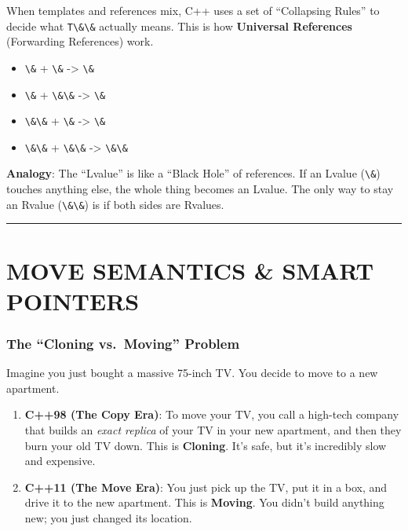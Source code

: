 When templates and references mix, C++ uses a set of ``Collapsing
Rules'' to decide what \passthrough{\lstinline!T\&\&!} actually means.
This is how \textbf{Universal References} (Forwarding References) work.

\begin{itemize}
\tightlist
\item
  \passthrough{\lstinline!\&!} + \passthrough{\lstinline!\&!}
  -\textgreater{} \passthrough{\lstinline!\&!}
\item
  \passthrough{\lstinline!\&!} + \passthrough{\lstinline!\&\&!}
  -\textgreater{} \passthrough{\lstinline!\&!}
\item
  \passthrough{\lstinline!\&\&!} + \passthrough{\lstinline!\&!}
  -\textgreater{} \passthrough{\lstinline!\&!}
\item
  \passthrough{\lstinline!\&\&!} + \passthrough{\lstinline!\&\&!}
  -\textgreater{} \passthrough{\lstinline!\&\&!}
\end{itemize}

\textbf{Analogy}: The ``Lvalue'' is like a ``Black Hole'' of references.
If an Lvalue (\passthrough{\lstinline!\&!}) touches anything else, the
whole thing becomes an Lvalue. The only way to stay an Rvalue
(\passthrough{\lstinline!\&\&!}) is if both sides are Rvalues.

\begin{center}\rule{0.5\linewidth}{0.5pt}\end{center}

\hypertarget{move-semantics-smart-pointers}{%
\section{MOVE SEMANTICS \& SMART
POINTERS}\label{move-semantics-smart-pointers}}

\hypertarget{the-cloning-vs.-moving-problem}{%
\subsubsection{The ``Cloning vs.~Moving''
Problem}\label{the-cloning-vs.-moving-problem}}

Imagine you just bought a massive 75-inch TV. You decide to move to a
new apartment.

\begin{enumerate}
\def\labelenumi{\arabic{enumi}.}
\tightlist
\item
  \textbf{C++98 (The Copy Era)}: To move your TV, you call a high-tech
  company that builds an \emph{exact replica} of your TV in your new
  apartment, and then they burn your old TV down. This is
  \textbf{Cloning}. It's safe, but it's incredibly slow and expensive.
\item
  \textbf{C++11 (The Move Era)}: You just pick up the TV, put it in a
  box, and drive it to the new apartment. This is \textbf{Moving}. You
  didn't build anything new; you just changed its location.
\end{enumerate}

